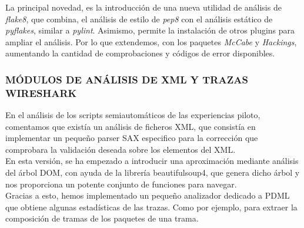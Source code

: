 La principal novedad, es la introducción de una nueva utilidad de análisis de \textit{flake8}, que combina, el análisis de estilo de \textit{pep8} con el análisis estático de \textit{pyflakes}, similar a \textit{pylint}. Asimismo, permite la instalación de otros plugins para ampliar el análisis. Por lo que extendemos, con los paquetes \textit{McCabe} y \textit{Hackings}, aumentando la cantidad de comprobaciones y códigos de error disponibles.\\


\subsubsection{MÓDULOS DE ANÁLISIS DE XML Y TRAZAS WIRESHARK}
\label{subsec:mod_anal_xml_wireshark}

En el análisis de los scripts semiautomáticos de las experiencias piloto, comentamos que existía un análisis de ficheros XML, que consistía en implementar un pequeño parser SAX especifico para la corrección que comprobara la validación deseada sobre los elementos del XML.\\


En esta versión,  se ha empezado a introducir una aproximación mediante análisis del árbol DOM, con ayuda de la librería beautifulsoup4, que genera dicho árbol y nos proporciona un potente conjunto de funciones para navegar.\\


Gracias a esto, hemos implementado un pequeño analizador dedicado a PDML que obtiene algunas estadísticas de las trazas. Como por ejemplo, para extraer la composición de tramas de los paquetes de una trama.\\

